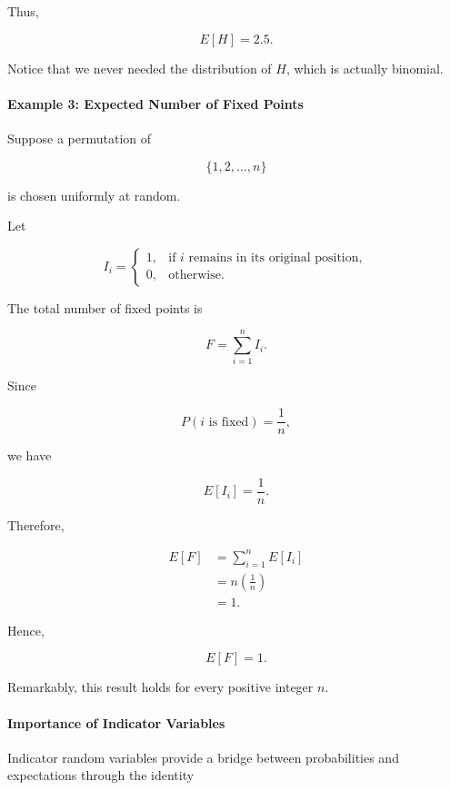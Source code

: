 \documentclass[11pt]{article}
\begin{document}
\begin{mdframed}[
		linewidth=0.8pt,
		roundcorner=6pt,
		backgroundcolor=gray!5,
		linecolor=gray!60,
		innertopmargin=10pt,
		innerbottommargin=10pt,
		innerleftmargin=10pt,
		innerrightmargin=10pt
		]
		Thus,
		
		\[
		\boxed{
			E[H]=2.5.
		}
		\]
		
		Notice that we never needed the distribution of \(H\), which is actually
		binomial.
		
		\bigskip
		
		\paragraph{Example 3: Expected Number of Fixed Points}
		
		Suppose a permutation of
		
		\[
		\{1,2,\ldots,n\}
		\]
		
		is chosen uniformly at random.
		
		Let
		
		\[
		I_i=
		\begin{cases}
			1,&\text{if }i\text{ remains in its original position},\\
			0,&\text{otherwise}.
		\end{cases}
		\]
		
		The total number of fixed points is
		
		\[
		F
		=
		\sum_{i=1}^{n}I_i.
		\]
		
		Since
		
		\[
		P(i\text{ is fixed})
		=
		\frac1n,
		\]
		
		we have
		
		\[
		E[I_i]
		=
		\frac1n.
		\]
		
		Therefore,
		
		\[
		\begin{aligned}
			E[F]
			&=
			\sum_{i=1}^{n}
			E[I_i]
			\\[0.3cm]
			&=
			n\left(\frac1n\right)
			\\[0.3cm]
			&=
			1.
		\end{aligned}
		\]
		
		Hence,
		
		\[
		\boxed{
			E[F]=1.
		}
		\]
		
		Remarkably, this result holds for every positive integer \(n\).
		
		\bigskip
		
		\paragraph{Importance of Indicator Variables}
		
		Indicator random variables provide a bridge between probabilities and
		expectations through the identity
		

\end{mdframed}
\end{document}

